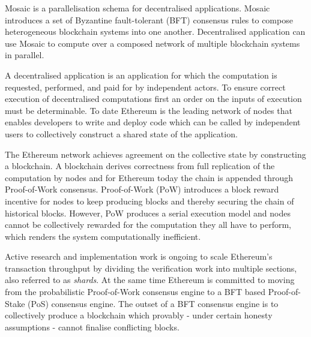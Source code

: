\documentclass[12pt,a4paper]{article}
\begin{document}
Mosaic is a parallelisation schema for decentralised applications.  Mosaic introduces a set of Byzantine fault-tolerant (BFT) consensus rules to compose heterogeneous blockchain systems into one another. Decentralised application can use Mosaic to compute over a composed network of multiple blockchain systems in parallel. 

A decentralised application is an application for which the computation is requested, performed, and paid for by independent actors. To ensure correct execution of decentralised computations first an order on the inputs of execution must be determinable.  To date Ethereum is the leading network%
of nodes that enables developers to write and deploy code which can be called by independent users to collectively construct a shared state of the application.

The Ethereum network achieves agreement on the collective state by constructing a blockchain.  A blockchain derives correctness from full replication of the computation by nodes and for Ethereum today the chain is appended through Proof-of-Work consensus.%
Proof-of-Work (PoW) introduces a block reward incentive for nodes to keep producing blocks and thereby securing the chain of historical blocks.  However, PoW produces a serial execution model and nodes cannot be collectively rewarded for the computation they all have to perform, which renders the system computationally inefficient\cite{verifiersdilemma}.

Active research and implementation work is ongoing to scale Ethereum's transaction throughput by dividing the verification work into multiple sections, also referred to as \emph{shards}. At the same time Ethereum is committed to moving from the probabilistic Proof-of-Work consensus engine to a BFT based Proof-of-Stake (PoS) consensus engine.%
The outset of a BFT consensus engine is to collectively produce a blockchain which provably - under certain honesty assumptions - cannot finalise conflicting blocks.

\end{document}
